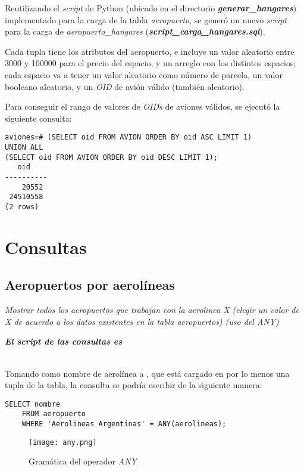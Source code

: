 Reutilizando el \emph{script} de Python (ubicado en el directorio \textbf{\emph{generar\_hangares}}) implementado para la carga de la tabla \emph{aeropuerto}, se generó un nuevo \emph{script} para la carga de \emph{aeropuerto\_hangares} (\textbf{\emph{script\_carga\_hangares.sql}}).

Cada tupla tiene los atributos del aeropuerto, e incluye un valor aleatorio entre 3000 y 100000 para el precio del espacio, y un arreglo con los distintos espacios; cada espacio va a tener un valor aleatorio como número de parcela, un valor booleano aleatorio, y un \emph{OID} de avión válido (también aleatorio).

Para conseguir el rango de valores de \emph{OIDs} de aviones válidos, se ejecutó la siguiente consulta:  

\vspace*{5mm}
\lstset{style=sql}
\begin{lstlisting}
aviones=# (SELECT oid FROM AVION ORDER BY oid ASC LIMIT 1)
UNION ALL 
(SELECT oid FROM AVION ORDER BY oid DESC LIMIT 1);
   oid    
----------
    20552
 24510558
(2 rows)
\end{lstlisting}


\section{Consultas}

\subsection{Aeropuertos por aerolíneas}
\emph{Mostrar todos los aeropuertos que trabajan con la aerolinea X (elegir un valor de X de acuerdo a los datos existentes en la tabla aeropuertos) (uso del ANY)} 

\emph{\textbf{El script de las consultas es }} 
\\~

Tomando como nombre de aerolínea a , que está cargado en por lo menos una tupla de la tabla, la consulta se podría escribir de la siguiente manera:

\vspace*{5mm}
\lstset{style=sql}
\begin{lstlisting}
SELECT nombre
    FROM aeropuerto 
    WHERE 'Aerolineas Argentinas' = ANY(aerolineas);
\end{lstlisting}

\begin{figure}[H]
    \texttt{[image: any.png]}
    \caption{Gramática del operador \emph{ANY} \cite{any}}
\end{figure}

